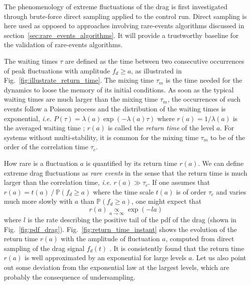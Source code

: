 \documentclass[pre,aps,floatfix,10pt,superscriptaddress, notitlepage,preprint]{revtex4-1}
\begin{document}
%
The phenomenology of extreme fluctuations of the drag is first investigated through brute-force direct sampling applied to the control run.
Direct sampling is here used as opposed to approaches involving rare-events algorithms discussed in section~\ref{sec:rare_events_algorithms}.
It will provide a trustworthy baseline for the validation of rare-events algorithms. 

The waiting times $\tau$ are defined as the time between two consecutive occurrences of peak fluctuations with amplitude $f_d \geq a$, as illustrated in Fig.~\ref{fig:illustrate_return_time}.  The mixing time $\tau_m$ is the time needed for the dynamics to loose the memory of its initial conditions. As soon as the typical waiting times are much larger than the mixing time $\tau_m$, the occurrences of such events follow a Poisson process and the distribution of the waiting times is exponential, \emph{i.e.} $P(\tau)=\lambda(a)\exp(-\lambda(a)\tau)$ where $r(a)=1/\lambda(a)$ is the averaged waiting time \cite{lestang_computing_2018}; $r(a)$ is called the {\it return time} of the level $a$. For systems without multi-stability, it is common for the mixing time $\tau_m$ to be of the order of the correlation time $\tau_c$.

How rare is a fluctuation $a$ is quantified by its return time $r(a)$. We can define extreme drag fluctuations as \textit{rare events} in the sense that the return time is much larger than the correlation time, \emph{i.e.} $r(a) \gg \tau_c$.
%
%
If one assumes that  $r(a) = t(a)~/~\mathbb{P}(f_d\geq a)$   where the time scale $t(a)$ is of order $\tau_c$ and varies much more slowly with $a$ than ${\mathbb{P}(f_d\geq a)}$,
one might expect that 
\begin{equation}
 \label{eq:return_time}
r(a) \underset{a\to\infty}{\propto} \exp(-la)
\end{equation}
where $l$ is the rate describing the positive tail of the \ac{pdf} of the drag (shown in Fig.~\ref{fig:pdf_drag}).
Fig.~\ref{fig:return_time_instant} shows the evolution of the return time $r(a)$ with the amplitude of fluctuation $a$, computed from {direct sampling} of the drag signal $f_d(t)$ \cite{lestang_computing_2018}. It is consistently found that the return time $r(a)$ is well approximated by an exponential for large levels $a$. Let us also point out some deviation from the exponential law at the largest levels, which are probably the consequence of undersampling.
\end{document}
